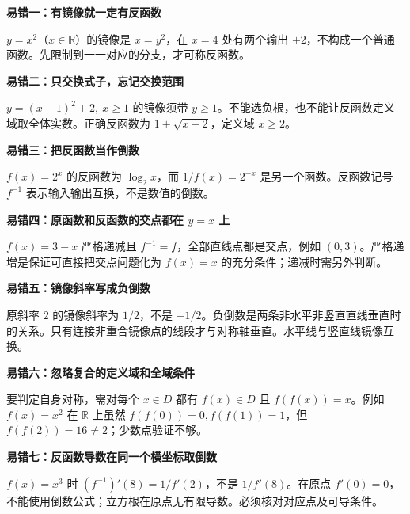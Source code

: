 \clearpage
\begin{trapbox}
\textbf{\textcolor{CTrap}{易错一：有镜像就一定有反函数}}


$y=x^2$（$x\in\mathbb R$）的镜像是 $x=y^2$，在 $x=4$ 处有两个输出 $\pm2$，不构成一个普通函数。先限制到一一对应的分支，才可称反函数。
\end{trapbox}
\clearpage
\begin{trapbox}
\textbf{\textcolor{CTrap}{易错二：只交换式子，忘记交换范围}}


$y=(x-1)^2+2,\ x\ge1$ 的镜像须带 $y\ge1$。不能选负根，也不能让反函数定义域取全体实数。正确反函数为 $1+\sqrt{x-2}$，定义域 $x\ge2$。
\end{trapbox}
\clearpage
\begin{trapbox}
\textbf{\textcolor{CTrap}{易错三：把反函数当作倒数}}


$f(x)=2^x$ 的反函数为 $\log_2 x$，而 $1/f(x)=2^{-x}$ 是另一个函数。反函数记号 $f^{-1}$ 表示输入输出互换，不是数值的倒数。
\end{trapbox}
\clearpage
\begin{trapbox}
\textbf{\textcolor{CTrap}{易错四：原函数和反函数的交点都在 $y=x$ 上}}


$f(x)=3-x$ 严格递减且 $f^{-1}=f$，全部直线点都是交点，例如 $(0,3)$。严格递增是保证可直接把交点问题化为 $f(x)=x$ 的充分条件；递减时需另外判断。
\end{trapbox}
\clearpage
\begin{trapbox}
\textbf{\textcolor{CTrap}{易错五：镜像斜率写成负倒数}}


原斜率 $2$ 的镜像斜率为 $1/2$，不是 $-1/2$。负倒数是两条非水平非竖直直线垂直时的关系。只有连接非重合镜像点的线段才与对称轴垂直。水平线与竖直线镜像互换。
\end{trapbox}
\clearpage
\begin{trapbox}
\textbf{\textcolor{CTrap}{易错六：忽略复合的定义域和全域条件}}


要判定自身对称，需对每个 $x\in D$ 都有 $f(x)\in D$ 且 $f(f(x))=x$。例如 $f(x)=x^2$ 在 $\mathbb R$ 上虽然 $f(f(0))=0,f(f(1))=1$，但 $f(f(2))=16\ne2$；少数点验证不够。
\end{trapbox}
\clearpage
\begin{trapbox}
\textbf{\textcolor{CTrap}{易错七：反函数导数在同一个横坐标取倒数}}


$f(x)=x^3$ 时 $(f^{-1})'(8)=1/f'(2)$，不是 $1/f'(8)$。在原点 $f'(0)=0$，不能使用倒数公式；立方根在原点无有限导数。必须核对对应点及可导条件。
\end{trapbox}
